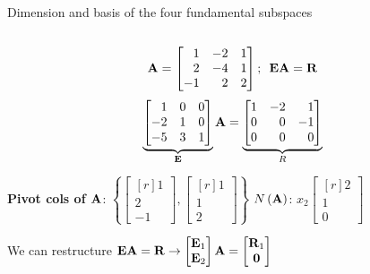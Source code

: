 \documentclass[aspectratio=169]{beamer}
\def\mf{\ensuremath\mathbf}
\def\lp{\ensuremath\left(}
\def\rp{\ensuremath\right)}
\begin{document}
\begin{frame}[t]{Dimension and basis of the four fundamental subspaces}
\vspace{-0.25cm}
\begin{columns}[T]
\begin{column}{0.5\textwidth}
\begin{small}
\[ \mf{A} = \begin{bmatrix*}[r]
1 & -2 & 1 \\
2 & -4 & 1 \\
-1 & 2 & 2 \\
\end{bmatrix*}; \,\,\, 
\mf{EA} = \mf{R} \]
\[
\underbrace{
\begin{bmatrix*}[r]
1 & 0 & 0 \\
-2 & 1 & 0 \\
-5 & 3 & 1 \\
\end{bmatrix*}}_{\mf{E}} \mf{A} = \underbrace{\begin{bmatrix*}[r]
1 & -2 & 1 \\
0 & 0 & -1 \\
0 & 0 & 0 \\
\end{bmatrix*}}_{R}
\]
\end{small}

\begin{footnotesize}
\textbf{Pivot cols of $\mf{A}$}: $\left\{
\begin{bmatrix*}[r]1\\2\\-1\end{bmatrix*},
\begin{bmatrix*}[r]1\\1\\2\end{bmatrix*}
\right\}$ \hspace{0.1cm}
$N\lp\mf{A}\rp$: $x_2\begin{bmatrix*}[r]2\\1\\0\end{bmatrix*}$

\vspace{0.5cm}
We can restructure $\mf{EA} = \mf{R} \rightarrow \begin{bmatrix*}\mf{E}_1\\\mf{E}_2\end{bmatrix*}\mf{A} = \begin{bmatrix*}\mf{R}_1\\\mf{0}\end{bmatrix*}$
\end{footnotesize}
\end{column}


\end{columns}
\end{frame}
\end{document}
